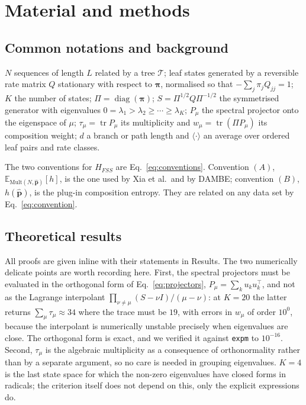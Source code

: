 \documentclass[11pt]{article}
\newcommand{\HFSS}{H_{FSS}}
\newcommand{\bpi}{\boldsymbol{\pi}}
\newcommand{\tr}{\operatorname{tr}}
\newcommand{\E}{\mathbb{E}}
\newcommand{\Mult}{\mathrm{Mult}}
\theoremstyle{definition}
\theoremstyle{remark}
\begin{document}
\section{Material and methods}

\subsection{Common notations and background}
\label{sec:notation}

$N$ sequences of length $L$ related by a tree $\mathcal T$; leaf states
generated by a reversible rate matrix $Q$ stationary with respect to $\bpi$,
normalised so that $-\sum_j\pi_jQ_{jj}=1$; $K$ the number of states;
$\Pi=\operatorname{diag}(\bpi)$; $S=\Pi^{1/2}Q\Pi^{-1/2}$ the symmetrised
generator with eigenvalues $0=\lambda_1>\lambda_2\ge\cdots\ge\lambda_K$;
$P_\mu$ the spectral projector onto the eigenspace of $\mu$;
$\tau_\mu=\tr P_\mu$ its multiplicity and $w_\mu=\tr(\Pi P_\mu)$ its
composition weight; $d$ a branch or path length and
$\langle\cdot\rangle$ an average over ordered leaf pairs and rate classes.

The two conventions for $\HFSS$ are Eq.~\eqref{eq:conventions}. Convention
$(A)$, $\E_{\Mult(N,\hat{\mathbf p})}[h]$, is the one used by Xia et al.\ and
by DAMBE; convention $(B)$, $h(\hat{\mathbf p})$, is the plug-in composition
entropy. They are related on any data set by Eq.~\eqref{eq:convention}.

\subsection{Theoretical results}

All proofs are given inline with their statements in Results. The two
numerically delicate points are worth recording here. First, the spectral
projectors must be evaluated in the orthogonal form of
Eq.~\eqref{eq:projectors}, $P_\mu=\sum_k u_ku_k^{\!\top}$, and not as the
Lagrange interpolant $\prod_{\nu\ne\mu}(S-\nu I)/(\mu-\nu)$: at $K=20$ the
latter returns $\sum_\mu\tau_\mu\approx34$ where the trace must be $19$, with
errors in $w_\mu$ of order $10^0$, because the interpolant is numerically
unstable precisely when eigenvalues are close. The orthogonal form is exact,
and we verified it against \texttt{expm} to $10^{-16}$. Second, $\tau_\mu$ is
the algebraic multiplicity as a consequence of orthonormality rather than by
a separate argument, so no care is needed in grouping eigenvalues. $K=4$ is
the last state space for which the non-zero eigenvalues have closed forms in
radicals; the criterion itself does not depend on this, only the explicit
expressions do.
\end{document}
